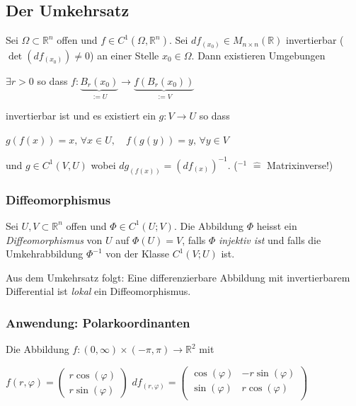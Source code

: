\documentclass[a4paper, fontsize = 8pt, landscape]{scrartcl}
\newcommand{\R}[0]{\mathbb{R}}
\begin{document}
\begin{multicols*}{3}
    \subsection{Der Umkehrsatz}

    Sei $\Omega \subset \R^n$ offen und $f \in C^1(\Omega, \R^n)$. Sei $df_{(x_0)} \in M_{n \times n}(\R)$ invertierbar ($\det(df_{(x_0)}) \neq 0$) an einer Stelle $x_0 \in \Omega$. Dann existieren Umgebungen

    \begin{center}
        $\exists r > 0$ so dass $f:\underbrace{B_r(x_0)}_{:= U} \to \underbrace{f(B_r(x_0))}_{:=V}$
    \end{center}

    invertierbar ist und es existiert ein $g: V \to U$ so dass

    \begin{center}
        $g(f(x)) = x, \, \forall x \in U, \quad f(g(y)) = y, \, \forall y \in V$
    \end{center}


    und $g \in C^1(V, U)$ wobei $dg_{(f(x))} = (df_{(x)})^{-1}$. ($^{-1}$ $\hat{=}$ Matrixinverse!)


    \subsubsection{Diffeomorphismus}

    Sei $U,V \subset \R^n$ offen und $\Phi \in C^1(U;V)$. Die Abbildung $\Phi$ heisst ein \emph{Diffeomorphismus} von $U$ auf $\Phi(U) = V$, falls $\Phi$ \emph{injektiv ist} und falls die Umkehrabbildung $\Phi^{-1}$ von der Klasse $C^1(V;U)$ ist. \medskip

    Aus dem Umkehrsatz folgt: Eine differenzierbare Abbildung mit invertierbarem Differential ist \emph{lokal} ein Diffeomorphismus.


    \subsubsection{Anwendung: Polarkoordinanten}

    Die Abbildung $f: (0, \infty) \times (-\pi,\pi)  \to \R^2$ mit

    \begin{center}
        $f(r, \varphi) = \begin{pmatrix}
                r \cos(\varphi) \\ r \sin(\varphi)
            \end{pmatrix}$ \qquad $df_{(r, \varphi)} = \begin{pmatrix}
                \cos(\varphi) & - r \sin(\varphi) \\ \sin(\varphi) & r \cos(\varphi) \\
            \end{pmatrix}$
    \end{center}


\end{multicols*}
\end{document}
